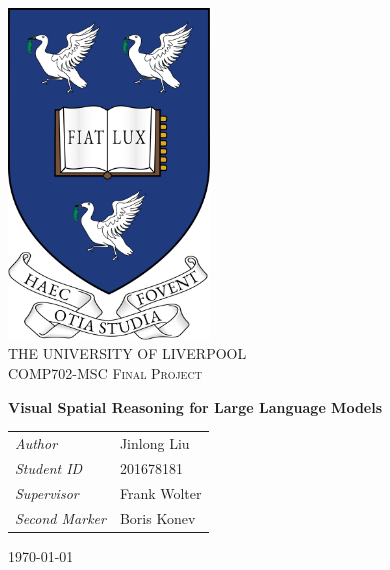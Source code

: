 \begin{titlepage}
\vbox{ }
\vbox{ }
\begin{center}

\includegraphics[width=0.40\textwidth]{liverpool.png}\\[1cm]

\textsc{\LARGE THE UNIVERSITY OF LIVERPOOL}\\[1.5cm]
\textsc{\Large COMP702-MSC Final Project}\\[0.5cm]
\vbox{ }



\huge \bfseries Visual Spatial Reasoning for Large Language Models\\[0.4cm]


\begin{table}[h]
\large
    \centering
    \begin{tabular}{ll}
        \emph{Author} & Jinlong Liu \\
        \emph{Student ID} & 201678181\\
        \emph{Supervisor} &  Frank Wolter \\
        \emph{Second Marker} &  Boris Konev \\
    \end{tabular}
\end{table}

\vfill
{\large \today}
\end{center}
\end{titlepage}